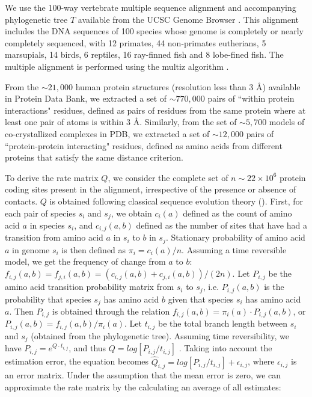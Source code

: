 We use the 100-way vertebrate multiple sequence alignment and accompanying phylogenetic tree $T$ available from the UCSC Genome Browser \cite{karolchik2014ucsc}. 
This alignment includes the DNA sequences of 100 species whose genome is completely or nearly completely sequenced, with 12 primates, 44 non-primates eutherians, 5 marsupials, 14 birds, 6 reptiles, 16 ray-finned fish and 8 lobe-fined fish.
The multiple alignment is performed using the multiz algorithm \cite{blanchette2004aligning,kielbasa2011adaptive}.

From the $\sim21,000$ human protein structures (resolution less than $3$ \r{A}) available in Protein Data Bank, we extracted a set of $\sim770,000$ pairs of ``within protein interactions" residues, defined as pairs of residues from the same protein where at least one pair of atoms is within $3$ \r{A}. 
Similarly, from the set of $\sim5,700$ models of co-crystallized complexes in PDB, we extracted a set of $\sim12,000$ pairs of ``protein-protein interacting" residues, defined as amino acids from different proteins that satisfy the same distance criterion.

To derive the rate matrix $Q$, we consider the complete set of $n \sim 22 \times 10^6$ protein coding sites present in the alignment, irrespective of the presence or absence of contacts. $Q$ is obtained following classical sequence evolution theory (\cite{yang2006computational, felsenstein2004inferring}). 
First, for each pair of species  $s_i$ and $s_j$, we obtain $c_i(a)$ defined as the count of amino acid $a$ in species $s_i$, and $c_{i,j}(a,b)$ defined as the number of sites that have had a transition from amino acid $a$ in $s_i$ to $b$ in $s_j$. 
Stationary probability of amino acid $a$ in genome $s_i$ is then defined as $\pi_i = c_i(a)/n$. 
Assuming a time reversible model, we get the frequency of change from $a$ to $b$: $f_{i,j}(a,b) = f_{j,i}(a,b) = (c_{i,j}(a,b) + c_{j,i}(a,b))/(2n)$. Let $P_{i,j}$ be the amino acid transition probability matrix from $s_i$ to $s_j$, i.e. $P_{i,j}(a,b)$ is the probability that species $s_j$ has amino acid $b$ given that species $s_i$ has amino acid $a$. 
Then $P_{i,j}$ is obtained through the relation $f_{i,j}(a,b) = \pi_i(a) \cdot P_{i,j}(a,b)$, or $P_{i,j}(a,b) =   f_{i,j}(a,b) /  \pi_i(a)$. 
Let $t_{i,j}$ be the total branch length between $s_i$ and $s_j$ (obtained from the phylogenetic tree). 
Assuming time reversibility, we have $P_{i,j} = e^{Q \cdot t_{i,j}}$, and thus $Q=log[ P_{i,j} / t_{i,j} ]$ \cite{yang2006computational}. 
Taking into account the estimation error, the equation becomes $\hat{Q}_{i,j} = log[ P_{i,j} / t_{i,j} ] + \epsilon_{i,j}$, where $\epsilon_{i,j}$ is an error matrix. Under the assumption that the mean error is zero, we can approximate the rate matrix by the calculating an average of all estimates:

